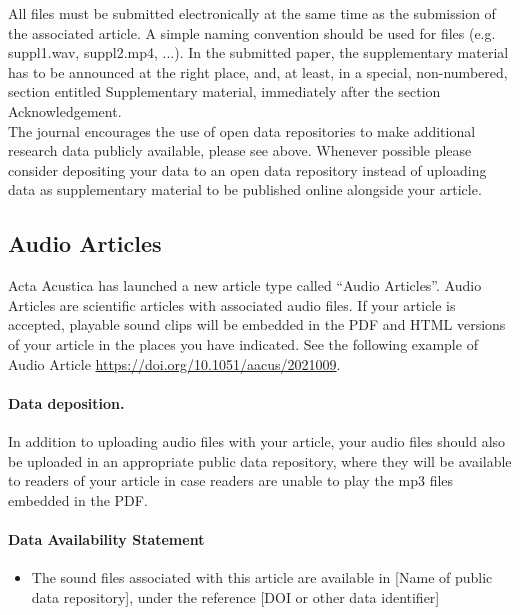 All files must be submitted electronically at the same time as the
submission of the associated article. A simple naming convention should
be used for files (e.g. suppl1.wav, suppl2.mp4, ...). In the submitted
paper, the supplementary material has to be announced at the right
place, and, at least, in a special, non-numbered, section entitled
\textquotedbl Supplementary material\textquotedbl , immediately
after the section \textquotedbl Acknowledgement\textquotedbl .\\

The journal encourages the use of open data repositories to make additional
research data publicly available, please see above. Whenever possible
please consider depositing your data to an open data repository instead
of uploading data as supplementary material to be published online
alongside your article.

\subsection{Audio Articles }

Acta Acustica has launched a new article type called \textquotedblleft Audio
Articles\textquotedblright . Audio Articles are scientific articles
with associated audio files. If your article is accepted, playable
sound clips will be embedded in the PDF and HTML versions of your
article in the places you have indicated. See the following example
of Audio Article \href{https://doi.org/10.1051/aacus/2021009}{https://doi.org/10.1051/aacus/2021009}.

\paragraph{Data deposition. }

In addition to uploading audio files with your article, your audio
files should also be uploaded in an appropriate public data repository,
where they will be available to readers of your article in case readers
are unable to play the mp3 files embedded in the PDF.

\paragraph{Data Availability Statement}
\begin{itemize}
\item The sound files associated with this article are available in {[}Name
of public data repository{]}, under the reference {[}DOI or other
data identifier{]} 
\end{itemize}